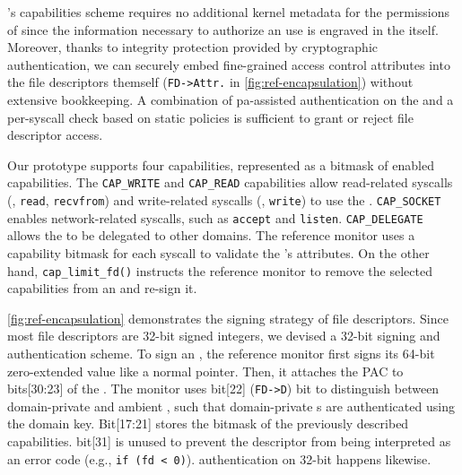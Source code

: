 \thename's \fd capabilities scheme requires no additional kernel metadata for the permissions of \fds since the information necessary to authorize an \fd use is engraved in the \fd itself.
Moreover, thanks to integrity protection provided by cryptographic authentication, we can securely embed fine-grained access control attributes into the file descriptors themself (\texttt{FD->Attr.} in \autoref{fig:ref-encapsulation}) without extensive bookkeeping.
A combination of \gls{pa}-assisted authentication on the \fd and a per-syscall check based on static policies is sufficient to grant or reject file descriptor access.

Our prototype supports four capabilities, represented as a bitmask of enabled capabilities.
The \texttt{CAP\_WRITE} and \texttt{CAP\_READ} capabilities allow read-related syscalls (\eg, \texttt{read}, \texttt{recvfrom}) and write-related syscalls (\eg, \texttt{write}) to use the \fd.
\texttt{CAP\_SOCKET} enables network-related syscalls, such as \texttt{accept} and \texttt{listen}.
\texttt{CAP\_DELEGATE} allows the \fd to be delegated to other domains.
The reference monitor uses a capability bitmask for each syscall to validate the \fd's attributes.
On the other hand, \texttt{cap\_limit\_fd()} instructs the reference monitor to remove the selected capabilities from an \fd and re-sign it.


\autoref{fig:ref-encapsulation} demonstrates the signing strategy of file descriptors.
Since most file descriptors are 32-bit signed integers, we devised a 32-bit signing and authentication scheme.
To sign an \fd, the reference monitor first signs its 64-bit zero-extended value like a normal pointer.
Then, it attaches the PAC to bits[30:23] of the \fd.
The monitor uses bit[22] (\texttt{FD->D}) bit to distinguish between domain-private and ambient \fd, such that domain-private {\fd}s are authenticated using the domain key.
Bit[17:21] stores the bitmask of the previously described \fd capabilities.
bit[31] is unused to prevent the descriptor from being interpreted as an error code (e.g., \texttt{if (fd < 0)}).
\fd authentication on 32-bit \fds happens likewise.

